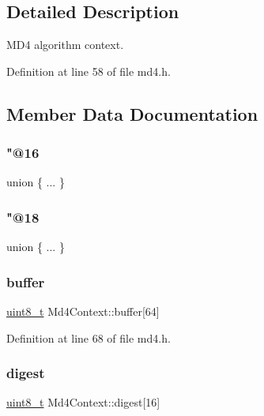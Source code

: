 \subsection{Detailed Description}
M\+D4 algorithm context. 

Definition at line 58 of file md4.\+h.



\subsection{Member Data Documentation}
\mbox{\label{structMd4Context_a3d077d4f4088cfff5292eccd892dcf43}} 
\subsubsection{\texorpdfstring{"@16}{@16}}
{\footnotesize\ttfamily union \{ ... \} }

\mbox{\label{structMd4Context_a1ac1e3bcf91c6ecb50a93e82c2168032}} 
\subsubsection{\texorpdfstring{"@18}{@18}}
{\footnotesize\ttfamily union \{ ... \} }

\mbox{\label{structMd4Context_a147578f591978c41d6852388aa6f9550}} 
\subsubsection{\texorpdfstring{buffer}{buffer}}
{\footnotesize\ttfamily \hyperlink{stdint_8h_aba7bc1797add20fe3efdf37ced1182c5}{uint8\+\_\+t} Md4\+Context\+::buffer\mbox{[}64\mbox{]}}



Definition at line 68 of file md4.\+h.

\mbox{\label{structMd4Context_a20d72c6b9df675ac808b1e94fbeac522}} 
\subsubsection{\texorpdfstring{digest}{digest}}
{\footnotesize\ttfamily \hyperlink{stdint_8h_aba7bc1797add20fe3efdf37ced1182c5}{uint8\+\_\+t} Md4\+Context\+::digest\mbox{[}16\mbox{]}}



